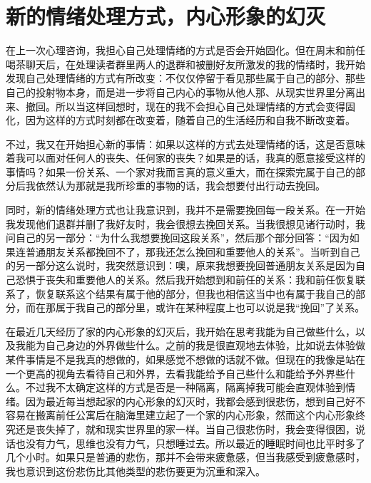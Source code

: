\chapter{新的情绪处理方式，内心形象的幻灭}






在上一次心理咨询，我担心自己处理情绪的方式是否会开始固化。但在周末和前任喝茶聊天后，在处理读者群里两人的退群和被删好友所激发的我的情绪时，我开始发现自己处理情绪的方式有所改变：不仅仅停留于看见那些属于自己的部分、那些自己的投射物本身，而是进一步将自己内心的事物从他人那、从现实世界里分离出来、撤回。所以当这样回想时，现在的我不会担心自己处理情绪的方式会变得固化，因为这样的方式时刻都在改变着，随着自己的生活经历和自我不断改变着。

不过，我又在开始担心新的事情：如果以这样的方式去处理情绪的话，这是否意味着我可以面对任何人的丧失、任何家的丧失？如果是的话，我真的愿意接受这样的事情吗？如果一份关系、一个家对我而言真的意义重大，而在探索完属于自己的部分后我依然认为那就是我所珍重的事物的话，我会想要付出行动去挽回。

同时，新的情绪处理方式也让我意识到，我并不是需要挽回每一段关系。在一开始我发现他们退群并删了我好友时，我会很想去挽回关系。当我很想见诸行动时，我问自己的另一部分：“为什么我想要挽回这段关系”，然后那个部分回答：“因为如果连普通朋友关系都挽回不了，那我还怎么挽回和重要他人的关系”。当听到自己的另一部分这么说时，我突然意识到：噢，原来我想要挽回普通朋友关系是因为自己恐惧于丧失和重要他人的关系。然后我开始想到和前任的关系：我和前任恢复联系了，恢复联系这个结果有属于他的部分，但我也相信这当中也有属于我自己的部分，而在那属于我自己的部分里，或许在某种程度上也可以说是我“挽回”了关系。

在最近几天经历了家的内心形象的幻灭后，我开始在思考我能为自己做些什么，以及我能为自己身边的外界做些什么。之前的我是很直观地去体验，比如说去体验做某件事情是不是我真的想做的，如果感觉不想做的话就不做。但现在的我像是站在一个更高的视角去看待自己和外界，去看我能给予自己些什么和能给予外界些什么。不过我不太确定这样的方式是否是一种隔离，隔离掉我可能会直观体验到情绪。因为最近每当想起家的内心形象的幻灭时，我都会感到很悲伤，想到自己好不容易在搬离前任公寓后在脑海里建立起了一个家的内心形象，然而这个内心形象终究还是丧失掉了，就和现实世界里的家一样。当自己很悲伤时，我会变得很困，说话也没有力气，思维也没有力气，只想睡过去。所以最近的睡眠时间也比平时多了几个小时。如果只是普通的悲伤，那并不会带来疲惫感，但当我感受到疲惫感时，我也意识到这份悲伤比其他类型的悲伤要更为沉重和深入。

